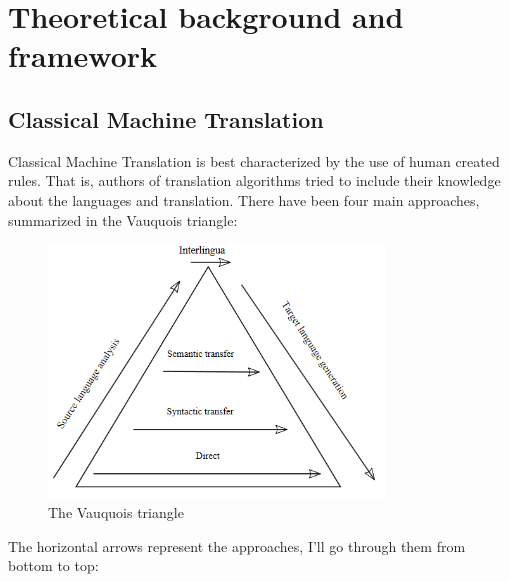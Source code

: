 \documentclass[12pt]{article}
\begin{document}
\section{Theoretical background and framework}

\subsection{Classical Machine Translation}

Classical Machine Translation is best characterized by the use of human created rules. That is, authors of translation algorithms tried to include their knowledge about the languages and translation. There have been four main approaches, summarized in the Vauquois triangle: \\

\begin{figure}[htb]
\centering
\includegraphics[width=0.8\textwidth]{vauquois.png}
\caption{The Vauquois triangle}
\label{fig:vauquois}
\end{figure}

The horizontal arrows represent the approaches, I'll go through them from bottom to top:
\end{document}
